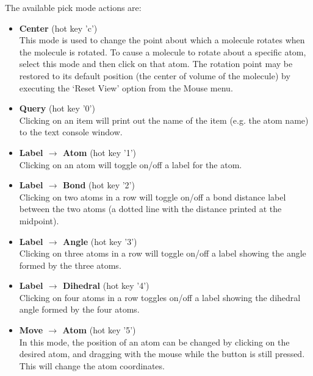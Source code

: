 The available pick mode actions are:
\begin{itemize}

\item {\bf Center}
\hspace{0.2in} (hot key 'c')
\\ 
This mode is used to change the point about which a molecule
rotates when the molecule is rotated.  To cause a molecule to rotate
about a specific atom, select this mode and then click on that atom.
The rotation point may be restored to its default position (the center
of volume of the molecule) by executing the `Reset View' option from
the Mouse menu.  

\item {\bf Query} 
\hspace{0.2in} (hot key '0')
\\
Clicking on an item will print out the name of the item (e.g. the 
atom name) to the text console window.

\item {\bf Label $\rightarrow$ Atom} 
\hspace{0.2in} (hot key '1')
\\
Clicking on an atom will toggle on/off a label for the atom.  

\item {\bf Label $\rightarrow$ Bond} 
\hspace{0.2in} (hot key '2')
\\
Clicking on two atoms in a row will toggle on/off a bond distance
label between the two atoms (a dotted line with the distance printed
at the midpoint).  

\item {\bf Label $\rightarrow$ Angle} 
\hspace{0.2in} (hot key '3')
\\
Clicking on three atoms in a row will toggle on/off a label showing
the angle formed by the three atoms. 

\item {\bf Label $\rightarrow$ Dihedral} 
\hspace{0.2in} (hot key '4')
\\
Clicking on four atoms in a row toggles on/off a label showing the
dihedral angle formed by the four atoms.  

\item {\bf Move $\rightarrow$ Atom} 
\hspace{0.2in} (hot key '5')
\\
In this mode, the position of an atom can be changed by clicking on 
the desired atom, and dragging with the mouse while the button is still
pressed.  This will change the atom coordinates.  


\end{itemize}
